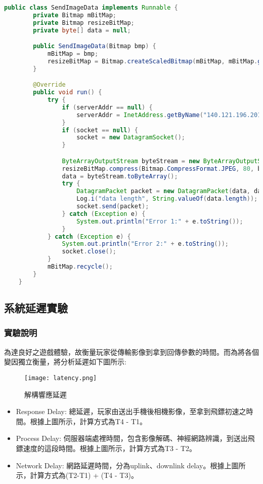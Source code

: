 \begin{lstlisting}[language=Java, caption=傳輸影像至伺服器端]
public class SendImageData implements Runnable {
        private Bitmap mBitMap;
        private Bitmap resizeBitMap;
        private byte[] data = null;

        public SendImageData(Bitmap bmp) {
            mBitMap = bmp;
            resizeBitMap = Bitmap.createScaledBitmap(mBitMap, mBitMap.getWidth() / 10, mBitMap.getHeight() / 10, true);
        }

        @Override
        public void run() {
            try {
                if (serverAddr == null) {
                    serverAddr = InetAddress.getByName("140.121.196.201");
                }
                if (socket == null) {
                    socket = new DatagramSocket();
                }

                ByteArrayOutputStream byteStream = new ByteArrayOutputStream();
                resizeBitMap.compress(Bitmap.CompressFormat.JPEG, 80, byteStream);
                data = byteStream.toByteArray();
                try {
                    DatagramPacket packet = new DatagramPacket(data, data.length, serverAddr, 5000);
                    Log.i("data length", String.valueOf(data.length));
                    socket.send(packet);
                } catch (Exception e) {
                    System.out.println("Error 1:" + e.toString());
                }
            } catch (Exception e) {
                System.out.println("Error 2:" + e.toString());
                socket.close();
            }
            mBitMap.recycle();
        }
    }
\end{lstlisting}
\subsection{系統延遲實驗}
\subsubsection{實驗說明}
為達良好之遊戲體驗，故衡量玩家從傳輸影像到拿到回傳參數的時間。而為將各個變因獨立衡量，將分析延遲如下圖所示:

\begin{figure}[h]
    \centering	
    \texttt{[image: latency.png]}
    \caption{解構響應延遲}
    \label{fig:decomposition of response delay}
\end{figure}

\begin{itemize}
\item Response Delay:
總延遲，玩家由送出手機後相機影像，至拿到飛鏢初速之時間。根據上圖所示，計算方式為T4 - T1。
\item Process Delay:
伺服器端處裡時間，包含影像解碼、神經網路辨識，到送出飛鏢速度的這段時間。根據上圖所示，計算方式為T3 - T2。
\item Network Delay:
網路延遲時間，分為uplink、downlink delay。根據上圖所示，計算方式為(T2-T1) + (T4 - T3)。
\end{itemize}
